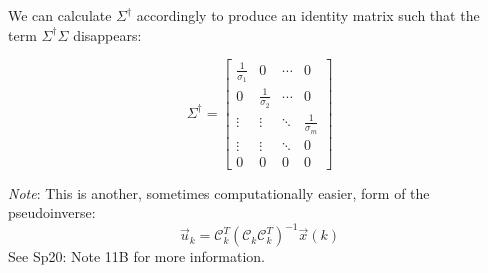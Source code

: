 We can calculate $\Sigma^{\dagger}$ accordingly to produce an identity matrix such that the term $\Sigma^{\dagger}\Sigma$ disappears:

$$\Sigma^{\dagger} = \begin{bmatrix} \frac{1}{\sigma_{1}} & 0 &  \cdots & 0 \\ 0 & \frac{1}{\sigma_{2}} & \cdots & 0 \\ \vdots & \vdots & \ddots & \frac{1}{\sigma_{m}} \\ 
    \vdots & \vdots & \ddots & 0 \\ 0 & 0 & 0 & 0 \end{bmatrix}$$

\textit{Note}: This is another, sometimes computationally easier, form of the pseudoinverse:
$$\vec{u}_k = \mathcal{C}_k^T(\mathcal{C}_k\mathcal{C}_k^T)^{-1}\vec{x}(k)$$
See Sp20: Note 11B for more information.